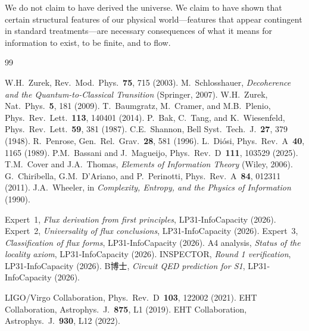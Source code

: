 \documentclass[reprint]{revtex4-2}
\begin{document}
We do not claim to have derived the universe. We claim to have shown that certain structural features of our physical world---features that appear contingent in standard treatments---are necessary consequences of what it means for information to exist, to be finite, and to flow.

\begin{thebibliography}{99}

 W.H.~Zurek, Rev.~Mod.~Phys.~\textbf{75}, 715 (2003).
 M.~Schlosshauer, \emph{Decoherence and the Quantum-to-Classical Transition} (Springer, 2007).
 W.H.~Zurek, Nat.~Phys.~\textbf{5}, 181 (2009).
 T.~Baumgratz, M.~Cramer, and M.B.~Plenio, Phys.~Rev.~Lett.~\textbf{113}, 140401 (2014).
 P.~Bak, C.~Tang, and K.~Wiesenfeld, Phys.~Rev.~Lett.~\textbf{59}, 381 (1987).
 C.E.~Shannon, Bell Syst.~Tech.~J.~\textbf{27}, 379 (1948).
 R.~Penrose, Gen.~Rel.~Grav.~\textbf{28}, 581 (1996).
 L.~Di\'osi, Phys.~Rev.~A~\textbf{40}, 1165 (1989).
 P.M.~Bassani and J.~Magueijo, Phys.~Rev.~D~\textbf{111}, 103529 (2025).
 T.M.~Cover and J.A.~Thomas, \emph{Elements of Information Theory} (Wiley, 2006).
 G.~Chiribella, G.M.~D'Ariano, and P.~Perinotti, Phys.~Rev.~A~\textbf{84}, 012311 (2011).
 J.A.~Wheeler, in \emph{Complexity, Entropy, and the Physics of Information} (1990).

 Expert~1, \emph{Flux derivation from first principles}, LP31-InfoCapacity (2026).
 Expert~2, \emph{Universality of flux conclusions}, LP31-InfoCapacity (2026).
 Expert~3, \emph{Classification of flux forms}, LP31-InfoCapacity (2026).
 A4 analysis, \emph{Status of the locality axiom}, LP31-InfoCapacity (2026).
 INSPECTOR, \emph{Round 1 verification}, LP31-InfoCapacity (2026).
 B博士, \emph{Circuit QED prediction for S1}, LP31-InfoCapacity (2026).

 LIGO/Virgo Collaboration, Phys.~Rev.~D~\textbf{103}, 122002 (2021).
 EHT Collaboration, Astrophys.~J.~\textbf{875}, L1 (2019).
 EHT Collaboration, Astrophys.~J.~\textbf{930}, L12 (2022).

\end{thebibliography}
\end{document}
